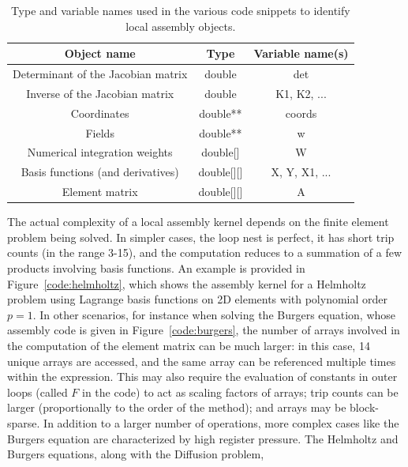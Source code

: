 \documentclass[conference]{IEEEtran}
\begin{document}

\begin{table}[h]
\begin{center}
\begin{tabulary}{1.0\columnwidth}{C|C|C}
\hline
Object name & Type & Variable name(s) \\\hline
Determinant of the Jacobian matrix & double & det  \\ 
Inverse of the Jacobian matrix & double & K1, K2, ... \\ 
Coordinates & double** & coords\\ 
Fields & double** & w \\ 
Numerical integration weights & double[] & W \\ 
Basis functions (and derivatives) & double[][] & X, Y, X1, ... \\ 
Element matrix & double[][] & A\\ \hline
\end{tabulary}
\end{center}
\caption{Type and variable names used in the various code snippets to identify local assembly objects.}
\label{table:map-name-letters}
\end{table}

The actual complexity of a local assembly kernel depends on the finite element problem being solved. In simpler cases, the loop nest is perfect, it has short trip counts (in the range 3-15), and the computation reduces to a summation of a few products involving basis functions. An example is provided in Figure~\ref{code:helmholtz}, which shows the assembly kernel for a Helmholtz problem using Lagrange basis functions on 2D elements with polynomial order $p=1$. In other scenarios, for instance when solving the Burgers equation, whose assembly code is given in Figure~\ref{code:burgers}, the number of arrays involved in the computation of the element matrix can be much larger: in this case, 14 unique arrays are accessed, and the same array can be referenced multiple times within the expression. This may also require the evaluation of constants in outer loops (called $F$ in the code) to act as scaling factors of arrays; trip counts can be larger (proportionally to the order of the method); and arrays may be block-sparse. In addition to a larger number of operations, more complex cases like the Burgers equation are characterized by high register pressure. The Helmholtz and Burgers equations, along with the Diffusion problem, 
\end{document}

